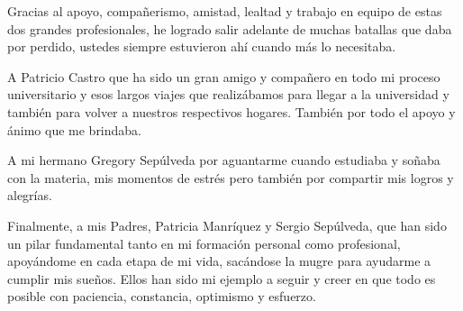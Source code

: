 \begin{acknowledgment}
    Gracias al apoyo, compañerismo, amistad, lealtad y trabajo en equipo de estas dos grandes profesionales, he logrado salir adelante de muchas batallas que daba por perdido, ustedes siempre estuvieron ahí cuando más lo necesitaba.
    
    A Patricio Castro que  ha sido un gran amigo y compañero en todo mi proceso universitario y esos largos viajes que realizábamos para llegar a la universidad y también para volver a nuestros respectivos hogares. También por todo el apoyo y ánimo que me brindaba.
    
    A mi hermano Gregory Sepúlveda por aguantarme cuando estudiaba y soñaba con la materia, mis momentos de estrés pero también por compartir mis logros y alegrías. 
    
    Finalmente, a mis Padres, Patricia Manríquez y Sergio Sepúlveda, que han sido un pilar fundamental tanto en mi formación personal como profesional, apoyándome en cada etapa de mi vida, sacándose la mugre para ayudarme a cumplir mis sueños. Ellos han sido mi ejemplo a seguir y creer en que todo es posible con paciencia, constancia, optimismo y esfuerzo.

\end{acknowledgment}